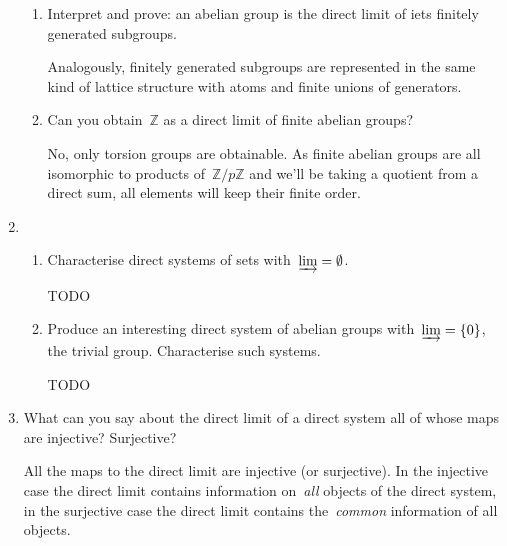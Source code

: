 \documentclass[a4paper,11pt,oneside,openany,article]{memoir}
\begin{document}
\begin{enumerate}
\begin{enumerate}
      \item Interpret and prove: an abelian group is the direct limit of iets finitely generated subgroups.

        \begin{solution}
          Analogously, finitely generated subgroups are represented in the same kind of lattice structure with atoms and finite unions of generators. 
        \end{solution}

      \item Can you obtain~$\mathbb{Z}$ as a direct limit of finite abelian groups?

        \begin{solution}
          No, only torsion groups are obtainable. As finite abelian groups are all isomorphic to products of~$\mathbb{Z}/p\mathbb{Z}$ and we'll be taking a quotient from a direct sum, all elements will keep their finite order.
        \end{solution}
    \end{enumerate}

  \item
    \begin{enumerate}
      \item Characterise direct systems of sets with~$\varinjlim=\emptyset$.

        \begin{solution}
          TODO
        \end{solution}

      \item Produce an interesting direct system of abelian groups with~$\varinjlim=\left\{ 0 \right\}$, the trivial group. Characterise such systems.

        \begin{solution}
          TODO
        \end{solution}
    \end{enumerate}

  \item What can you say about the direct limit of a direct system all of whose maps are injective? Surjective?

    \begin{solution}
      All the maps to the direct limit are injective (or surjective). In the injective case the direct limit contains information on~\emph{all} objects of the direct system, in the surjective case the direct limit contains the~\emph{common} information of all objects.
    \end{solution}


\end{enumerate}
\end{document}
